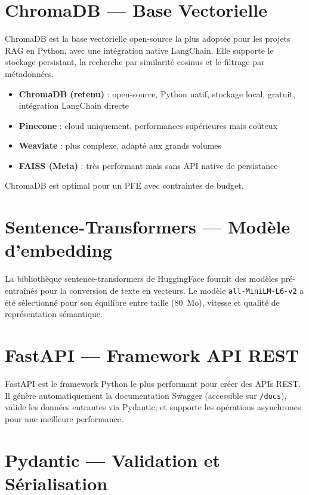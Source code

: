 \documentclass[12pt, a4paper]{report}
\begin{document}
\section{ChromaDB — Base Vectorielle}

ChromaDB est la base vectorielle open-source la plus adoptée pour les projets RAG en Python, avec une intégration native LangChain. Elle supporte le stockage persistant, la recherche par similarité cosinus et le filtrage par métadonnées.

\begin{formulebox}[title={\bfseries\color{navyblue} Comparaison des bases vectorielles}]
\begin{itemize}
  \item \textbf{ChromaDB (retenu)} : open-source, Python natif, stockage local, gratuit, intégration LangChain directe
  \item \textbf{Pinecone} : cloud uniquement, performances supérieures mais coûteux
  \item \textbf{Weaviate} : plus complexe, adapté aux grands volumes
  \item \textbf{FAISS (Meta)} : très performant mais sans API native de persistance
\end{itemize}
ChromaDB est optimal pour un PFE avec contraintes de budget.
\end{formulebox}

\section{Sentence-Transformers — Modèle d'embedding}

La bibliothèque sentence-transformers de HuggingFace fournit des modèles pré-entraînés pour la conversion de texte en vecteurs. Le modèle \texttt{all-MiniLM-L6-v2} a été sélectionné pour son équilibre entre taille (80~Mo), vitesse et qualité de représentation sémantique.

\section{FastAPI — Framework API REST}

FastAPI est le framework Python le plus performant pour créer des APIs REST. Il génère automatiquement la documentation Swagger (accessible sur \texttt{/docs}), valide les données entrantes via Pydantic, et supporte les opérations asynchrones pour une meilleure performance.

\section{Pydantic — Validation et Sérialisation}
\end{document}
